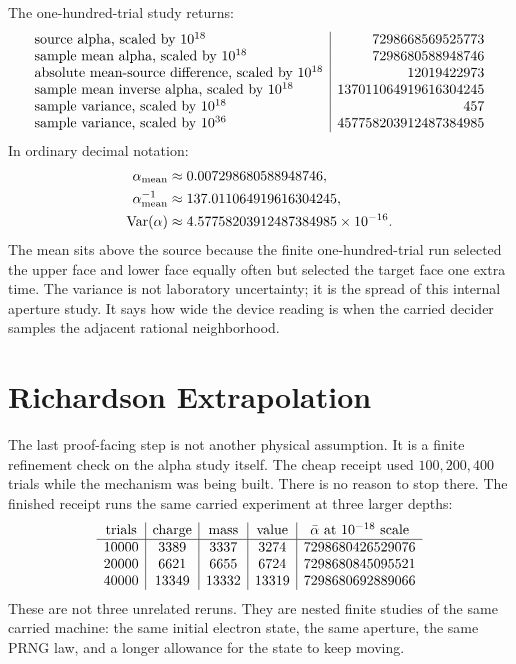 The one-hundred-trial study returns:
\[
\begin{array}{l|r}
\hbox{source alpha, scaled by }10^{18} & 7298668569525773\\
\hbox{sample mean alpha, scaled by }10^{18} & 7298680588948746\\
\hbox{absolute mean-source difference, scaled by }10^{18} & 12019422973\\
\hbox{sample mean inverse alpha, scaled by }10^{18} & 137011064919616304245\\
\hbox{sample variance, scaled by }10^{18} & 457\\
\hbox{sample variance, scaled by }10^{36} & 457758203912487384985
\end{array}
\]
In ordinary decimal notation:
\[
\begin{aligned}
  \alpha_{\rm mean} &\approx 0.007298680588948746,\\
  \alpha_{\rm mean}^{-1} &\approx 137.011064919616304245,\\
  {\rm Var}(\alpha) &\approx 4.57758203912487384985\times 10^{-16}.
\end{aligned}
\]
The mean sits above the source because the finite one-hundred-trial run selected the upper face and lower face
equally often but selected the target face one extra time. The variance is not laboratory uncertainty; it is the
spread of this internal aperture study. It says how wide the device reading is when the carried decider samples
the adjacent rational neighborhood.

\section{Richardson Extrapolation}

The last proof-facing step is not another physical assumption. It is a finite refinement check on the alpha
study itself. The cheap receipt used \(100,200,400\) trials while the mechanism was being built. There is no
reason to stop there. The finished receipt runs the same carried experiment at three larger depths:
\[
\begin{array}{c|c|c|c|c}
\hbox{trials} & \hbox{charge} & \hbox{mass} & \hbox{value}
  & \bar\alpha\hbox{ at }10^{-18}\hbox{ scale}\\
\hline
10000 & 3389 & 3337 & 3274 & 7298680426529076\\
20000 & 6621 & 6655 & 6724 & 7298680845095521\\
40000 & 13349 & 13332 & 13319 & 7298680692889066
\end{array}
\]
These are not three unrelated reruns. They are nested finite studies of the same carried machine: the same initial
electron state, the same aperture, the same PRNG law, and a longer allowance for the state to keep moving.

